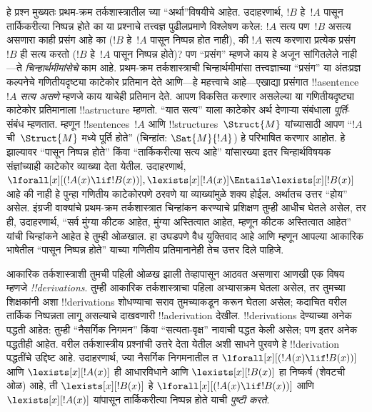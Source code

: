 \documentclass[../../../include/open-logic-section]{subfiles}
\begin{document}
हे प्रश्न मुख्यतः प्रथम-क्रम तर्कशास्त्रातील च्या
``अर्था''विषयीचे आहेत. उदाहरणार्थ, $!B$ हे~$!A$ पासून तार्किकरीत्या
निष्पन्न होते का या प्रश्नाचे तत्त्वज्ञ पुढीलप्रमाणे विश्लेषण करेल:
$!A$ सत्य पण~$!B$ असत्य असणारा काही प्रसंग आहे का ($!B$ हे~$!A$
पासून निष्पन्न होत नाही), की $!A$ सत्य करणारा प्रत्येक प्रसंग~$!B$ ही
सत्य करतो ($!B$ हे~$!A$ पासून निष्पन्न होते)? पण ``प्रसंग'' म्हणजे काय
हे अजून सांगितलेले नाही---ते \emph{चिन्हार्थमीमांसेचे} काम आहे.
प्रथम-क्रम तर्कशास्त्राची चिन्हार्थमीमांसा तत्त्वज्ञाच्या ``प्रसंग'' या
अंतःप्रज्ञ कल्पनेचे गणितीयदृष्ट्या काटेकोर प्रतिमान देते आणि---हे
महत्त्वाचे आहे---एखाद्या प्रसंगात !!a{sentence}~$!A$ \emph{सत्य असणे}
म्हणजे काय याचेही प्रतिमान देते. आपण विकसित करणार असलेल्या या
गणितीयदृष्ट्या काटेकोर प्रतिमानाला !!a{structure} म्हणतो. ``यात सत्य''
याला काटेकोर अर्थ देणाऱ्या संबंधाला \emph{पूर्ति}-संबंध म्हणतात. म्हणून
!!{sentence}s~$!A$ आणि !!{structure}s~$\Struct{M}$ यांच्यासाठी आपण
``$!A$ ची~$\Struct{M}$ मध्ये पूर्ति होते'' (चिन्हांत:
$\Sat{M}{!A}$) हे परिभाषित करणार आहोत. हे झाल्यावर ``पासून निष्पन्न
होते'' किंवा ``तार्किकरीत्या सत्य आहे'' यांसारख्या इतर चिन्हार्थविषयक
संज्ञांच्याही काटेकोर व्याख्या देता येतील. उदाहरणार्थ,
$\lforall[x][(!A(x) \lif !B(x))],
\lexists[x][!A(x)] \Entails \lexists[x][!B(x)]$ आहे की नाही हे पुन्हा
गणितीय काटेकोरपणे ठरवणे या व्याख्यांमुळे शक्य होईल. अर्थातच उत्तर
``होय'' असेल. इंग्रजी वाक्यांचे प्रथम-क्रम तर्कशास्त्रात चिन्हांकन
करण्याचे प्रशिक्षण तुम्ही आधीच घेतले असेल, तर ही, उदाहरणार्थ, ``सर्व
मुंग्या कीटक आहेत, मुंग्या अस्तित्वात आहेत, म्हणून कीटक अस्तित्वात
आहेत'' यांची चिन्हांकने आहेत हे तुम्ही ओळखाल. हा उघडपणे वैध युक्तिवाद
आहे आणि म्हणून आपल्या आकारिक भाषेतील ``पासून निष्पन्न होते'' याच्या
गणितीय प्रतिमानानेही तेच उत्तर दिले पाहिजे.

आकारिक तर्कशास्त्राशी तुमची पहिली ओळख झाली तेव्हापासून आठवत असणारा
आणखी एक विषय म्हणजे \emph{!!{derivation}s}. तुम्ही आकारिक
तर्कशास्त्राचा पहिला अभ्यासक्रम घेतला असेल, तर तुमच्या शिक्षकांनी अशा
!!{derivation}s शोधण्याचा सराव तुमच्याकडून करून घेतला असेल; कदाचित
वरील तार्किक निष्पन्नता लागू असल्याचे दाखवणारी !!a{derivation} देखील.
!!{derivation}s देण्याच्या अनेक पद्धती आहेत: तुम्ही ``नैसर्गिक निगमन''
किंवा ``सत्यता-वृक्ष'' नावाची पद्धत केली असेल; पण इतर अनेक पद्धतीही
आहेत. वरील तर्कशास्त्रीय प्रश्नांची उत्तरे देता येतील अशी साधने पुरवणे
हे !!{derivation} पद्धतींचे उद्दिष्ट आहे. उदाहरणार्थ, ज्या नैसर्गिक
निगमनातील त $\lforall[x][(!A(x) \lif !B(x))]$ आणि
$\lexists[x][!A(x)]$ ही आधारविधाने आणि $\lexists[x][!B(x)]$ हा
निष्कर्ष (शेवटची ओळ) आहे, ती $\lexists[x][!B(x)]$ हे
$\lforall[x][(!A(x) \lif !B(x))]$ आणि $\lexists[x][!A(x)]$ यांपासून
तार्किकरीत्या निष्पन्न होते याची \emph{पुष्टी करते}.
\end{document}
